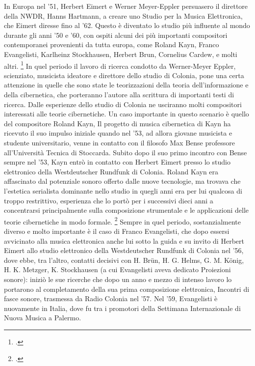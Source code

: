 In Europa nel '51, Herbert Eimert e Werner Meyer-Eppler
persuasero il direttore della NWDR,
Hanns Hartmann,
a creare uno Studio per la Musica Elettronica, che Eimert diresse fino al '62.
Questo è diventato lo studio più influente al mondo durante gli anni '50 e '60,
con ospiti alcuni dei più importanti compositori contemporanei provenienti da tutta europa,
come Roland Kayn, Franco Evangelisti, Karlheinz Stockhausen, Herbert Brun,
Cornelius Cardew, e molti altri. \footcite{EMSColonia}
In quel periodo il lavoro di ricerca condotto da Werner-Meyer Eppler,
scienziato, musicista ideatore e direttore dello studio di Colonia,
pone una certa attenzione in quelle che sono state
le teorizzazioni della teoria dell'informazione e della cibernetica,
che porteranno l'autore alla scrittura di importanti testi di ricerca.
Dalle esperienze dello studio di Colonia ne usciranno molti compositori interessati
alle teorie cibernetiche.
Un caso importante in questo scenario è quello del compositore Roland Kayn,
Il progetto di musica cibernetica di Kayn ha ricevuto il suo impulso iniziale
quando nel '53, ad allora giovane musicista e studente universitario,
venne in contatto con il filosofo Max Bense professore all'Università Tecnica di Stoccarda.
Subito dopo il suo primo incontro con Bense sempre nel '53, Kayn entrò in contatto con Herbert
Eimert presso lo studio elettronico della Westdeutscher Rundfunk di Colonia.
Roland Kayn era affascinato dal potenziale sonoro offerto dalle nuove tecnologie,
ma trovava che l'estetica serialista dominante nello studio in quegli anni
era per lui qualcosa di troppo restrittivo, esperienza che lo portò
per i successivi dieci anni a concentrarsi
principalmente sulla composizione strumentale e le applicazioni delle teorie
cibernetiche in modo formale. \footcite{thomaswpattesonkayn}
Sempre in quel periodo, sostanzialmente diverso e molto importante
è il caso di Franco Evangelisti, che dopo essersi avvicinato alla musica elettronica
anche lui sotto la guida e su invito di Herbert Eimert allo studio elettronico
della Westdeutscher Rundfunk di Colonia nel '56, dove ebbe, tra l’altro,
contatti decisivi con H. Brün, H. G. Helms, G. M. König, H. K. Metzger,
K. Stockhausen (a cui Evangelisti aveva dedicato Proiezioni sonore):
iniziò le sue ricerche che dopo un anno e mezzo di intenso lavoro lo portarono
al completamento della sua prima composizione elettronica,
Incontri di fasce sonore, trasmessa da Radio Colonia nel '57.
Nel '59, Evangelisti è nuovamente in Italia, dove fu tra i promotori
della Settimana Internazionale di Nuova Musica a Palermo.
